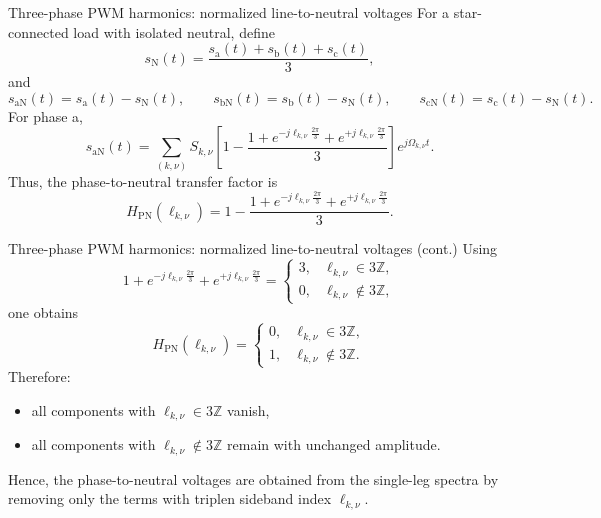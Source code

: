\begin{frame}{Three-phase PWM harmonics: normalized line-to-neutral voltages}
    For a star-connected load with isolated neutral, define
    \[
        s_\mathrm{N}(t)=\frac{s_\mathrm{a}(t)+s_\mathrm{b}(t)+s_\mathrm{c}(t)}{3},
    \]
    and
    \[
        s_{\mathrm{aN}}(t)=s_\mathrm{a}(t)-s_\mathrm{N}(t),
        \qquad
        s_{\mathrm{bN}}(t)=s_\mathrm{b}(t)-s_\mathrm{N}(t),
        \qquad
        s_{\mathrm{cN}}(t)=s_\mathrm{c}(t)-s_\mathrm{N}(t).
    \]
    For phase a,
    \[
        s_{\mathrm{aN}}(t)=
        \sum_{(k,\nu)}
        S_{k,\nu}
        \left[
            1-\frac{1+e^{-j\ell_{k,\nu}\frac{2\pi}{3}}+e^{+j\ell_{k,\nu}\frac{2\pi}{3}}}{3}
            \right]
        e^{j\Omega_{k,\nu}t}.
    \]
    Thus, the phase-to-neutral transfer factor is
    \[
        H_{\mathrm{PN}}(\ell_{k,\nu})=
        1-\frac{1+e^{-j\ell_{k,\nu}\frac{2\pi}{3}}+e^{+j\ell_{k,\nu}\frac{2\pi}{3}}}{3}.
    \]
\end{frame}

\begin{frame}{Three-phase PWM harmonics: normalized line-to-neutral voltages (cont.)}
    Using
    \[
        1+e^{-j\ell_{k,\nu}\frac{2\pi}{3}}+e^{+j\ell_{k,\nu}\frac{2\pi}{3}}
        =
        \begin{cases}
            3, & \ell_{k,\nu}\in 3\mathbb{Z},    \\
            0, & \ell_{k,\nu}\notin 3\mathbb{Z},
        \end{cases}
    \]
    one obtains
    \[
        H_{\mathrm{PN}}(\ell_{k,\nu})=
        \begin{cases}
            0, & \ell_{k,\nu}\in 3\mathbb{Z},    \\
            1, & \ell_{k,\nu}\notin 3\mathbb{Z}.
        \end{cases}
    \]
    Therefore:
    \begin{itemize}
        \item all components with $\ell_{k,\nu}\in 3\mathbb{Z}$ vanish,
        \item all components with $\ell_{k,\nu}\notin 3\mathbb{Z}$ remain with unchanged amplitude.
    \end{itemize}
    Hence, the phase-to-neutral voltages are obtained from the single-leg spectra by removing only the terms with triplen sideband index $\ell_{k,\nu}$.
\end{frame}

